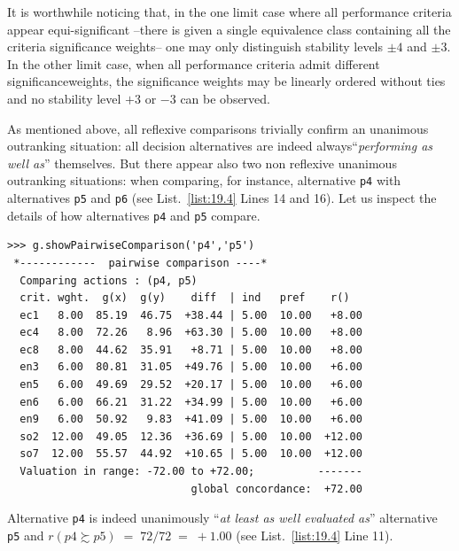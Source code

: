 It is worthwhile noticing that, in the one limit case where all performance criteria appear equi-significant --there is given a single equivalence class containing all the criteria significance weights-- one may only distinguish stability levels $\pm 4$ and $\pm 3$. In the other limit case, when all performance criteria admit different significanceweights, the significance weights may be linearly ordered without ties and no stability level $+3$ or $-3$ can be observed.

As mentioned above, all reflexive comparisons trivially confirm an unanimous outranking situation: all decision alternatives are indeed always``\emph{performing as well as}'' themselves. But there appear also two non reflexive unanimous outranking situations: when comparing, for instance, alternative \texttt{p4} with alternatives \texttt{p5} and \texttt{p6} (see List.~\vref{list:19.4} Lines 14 and 16). Let us inspect the details of how alternatives \texttt{p4} and \texttt{p5} compare.
\begin{lstlisting}
>>> g.showPairwiseComparison('p4','p5')
 *------------  pairwise comparison ----*
  Comparing actions : (p4, p5)
  crit. wght.  g(x)  g(y)    diff  | ind   pref    r()
  ec1   8.00  85.19  46.75  +38.44 | 5.00  10.00   +8.00
  ec4   8.00  72.26   8.96  +63.30 | 5.00  10.00   +8.00
  ec8   8.00  44.62  35.91   +8.71 | 5.00  10.00   +8.00
  en3   6.00  80.81  31.05  +49.76 | 5.00  10.00   +6.00
  en5   6.00  49.69  29.52  +20.17 | 5.00  10.00   +6.00
  en6   6.00  66.21  31.22  +34.99 | 5.00  10.00   +6.00
  en9   6.00  50.92   9.83  +41.09 | 5.00  10.00   +6.00
  so2  12.00  49.05  12.36  +36.69 | 5.00  10.00  +12.00
  so7  12.00  55.57  44.92  +10.65 | 5.00  10.00  +12.00
  Valuation in range: -72.00 to +72.00;          -------
                             global concordance:  +72.00
\end{lstlisting}
Alternative \texttt{p4} is indeed  unanimously ``\emph{at least as well evaluated as}'' alternative \texttt{p5} and $r(p4 \succsim p5)\; =\; 72/72\; =\; +1.00$ (see List.~\vref{list:19.4} Line 11).

